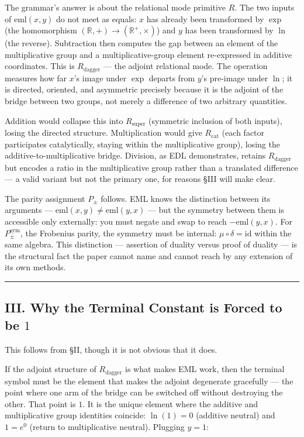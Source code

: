 \documentclass[12pt,a4paper]{article}
\newcommand{\pilcrow}{\S}
\begin{document}
The grammar's answer is about the relational mode primitive $R$. The two inputs of
$\text{eml}(x,y)$ do not meet as equals: $x$ has already been transformed by
$\exp$ (the homomorphism $(\mathbb{R},+) \to (\mathbb{R}^+,\times)$) and $y$ has
been transformed by $\ln$ (the reverse). Subtraction then computes the gap between
an element of the multiplicative group and a multiplicative-group element
re-expressed in additive coordinates. This is $R_\text{dagger}$ --- the adjoint
relational mode. The operation measures how far $x$'s image under $\exp$ departs
from $y$'s pre-image under $\ln$; it is directed, oriented, and asymmetric
precisely because it is the adjoint of the bridge between two groups, not merely
a difference of two arbitrary quantities.

Addition would collapse this into $R_\text{super}$ (symmetric inclusion of both
inputs), losing the directed structure. Multiplication would give $R_\text{cat}$
(each factor participates catalytically, staying within the multiplicative group),
losing the additive-to-multiplicative bridge. Division, as EDL demonstrates,
retains $R_\text{dagger}$ but encodes a ratio in the multiplicative group rather
than a translated difference --- a valid variant but not the primary one, for reasons
\pilcrow{}III will make clear.

The parity assignment $P_{\pm}$ follows. EML knows the distinction between its
arguments --- $\text{eml}(x,y) \neq \text{eml}(y,x)$ --- but the symmetry between
them is accessible only externally: you must negate and swap to reach
$-\text{eml}(y,x)$. For $P_{\pm}^{\text{sym}}$, the Frobenius parity, the
symmetry must be internal: $\mu \circ \delta = \text{id}$ within the same algebra.
This distinction --- assertion of duality versus proof of duality --- is the structural
fact the paper cannot name and cannot reach by any extension of its own methods.

\begin{center}
\rule{0.5\textwidth}{0.4pt}
\end{center}

\subsection{III. Why the Terminal Constant is Forced to be $1$}

This follows from \pilcrow{}II, though it is not obvious that it does.

If the adjoint structure of $R_\text{dagger}$ is what makes EML work, then the
terminal symbol must be the element that makes the adjoint degenerate gracefully
--- the point where one arm of the bridge can be switched off without destroying
the other. That point is $1$. It is the unique element where the additive and
multiplicative group identities coincide: $\ln(1) = 0$ (additive neutral) and
$1 = e^0$ (return to multiplicative neutral). Plugging $y = 1$:
\end{document}
